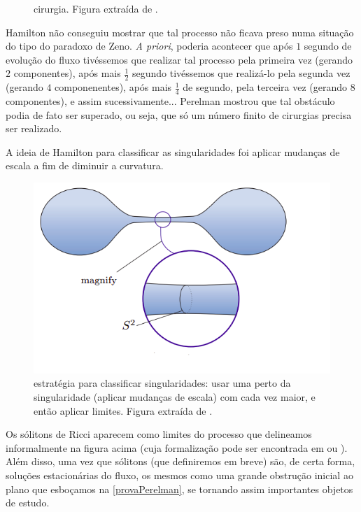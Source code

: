 \begin{oobs}
\begin{figure}[H]
        \caption{cirurgia. Figura extraída de .}
        \end{figure}
        Hamilton não conseguiu mostrar que tal processo não ficava preso numa situação do tipo do paradoxo de Zeno. \emph{A priori}, poderia acontecer que após $1$ segundo de evolução do fluxo tivéssemos que realizar tal processo pela primeira vez (gerando $2$ componentes), após mais $\frac{1}{2}$ segundo tivéssemos que realizá-lo pela segunda vez (gerando $4$ componenentes), após mais $\frac{1}{4}$ de segundo, pela terceira vez (gerando $8$ componentes), e assim sucessivamente... Perelman mostrou que tal obstáculo podia de fato ser superado, ou seja, que só um número finito de cirurgias precisa ser realizado. 
        \end{oobs}
        
        \begin{oobs}
        A ideia de Hamilton para classificar as singularidades foi aplicar mudanças de escala a fim de diminuir a curvatura.
        \begin{figure}[H]
        \centering
        \includegraphics[scale=.4]{blowup.png}
        \vspace{-0.8cm}
        \caption{estratégia para classificar singularidades: usar uma  perto da singularidade (aplicar mudanças de escala) com  cada vez maior, e então aplicar limites. Figura extraída de .}
        \end{figure}
        Os sólitons de Ricci aparecem como limites do processo que delineamos informalmente na figura acima (cuja formalização pode ser encontrada em  ou ). Além disso, uma vez que sólitons (que definiremos em breve) são, de certa forma, soluções estacionárias do fluxo, os mesmos  como uma grande obstrução inicial ao plano que esboçamos na \cref{provaPerelman}, se tornando assim importantes objetos de estudo.  
        \end{oobs}



